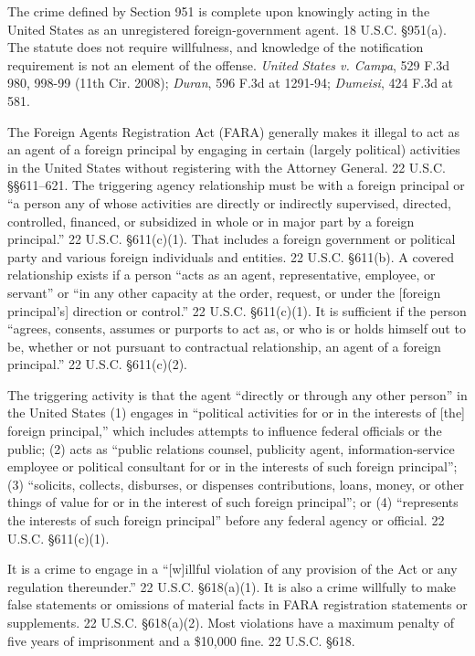 The crime defined by Section 951 is complete upon knowingly acting in the United States as an unregistered foreign-government agent.
18 U.S.C. \S 951(a).
The statute does not require willfulness, and knowledge of the notification requirement is not an element of the offense.
\textit{United States v. Campa}, 529 F.3d 980, 998-99 (11th Cir. 2008); \textit{Duran}, 596 F.3d at 1291-94; \textit{Dumeisi}, 424 F.3d at 581.

The Foreign Agents Registration Act (FARA) generally makes it illegal to act as an agent of a foreign principal by engaging in certain (largely political) activities in the United States without registering with the Attorney General. 22 U.S.C. \S\S 611--621. The triggering agency relationship must be with a foreign principal or ``a person any of whose activities are directly or indirectly supervised, directed, controlled, financed, or subsidized in whole or in major part by a foreign principal.'' 22 U.S.C. \S 611(c)(1).
That includes a foreign government or political party and various foreign individuals and entities.
22 U.S.C. \S 611(b).
A covered relationship exists if a person ``acts as an agent, representative, employee, or servant'' or ``in any other capacity at the order, request, or under the [foreign principal's] direction or control.''
22 U.S.C. \S 611(c)(1).
It is sufficient if the person ``agrees, consents, assumes or purports to act as, or who is or holds himself out to be, whether or not pursuant to contractual relationship, an agent of a foreign principal.''
22 U.S.C. \S 611(c)(2).

The triggering activity is that the agent ``directly or through any other person'' in the United States (1) engages in ``political activities for or in the interests of [the] foreign principal,'' which includes attempts to influence federal officials or the public; (2) acts as ``public relations counsel, publicity agent, information-service employee or political consultant for or in the interests of such foreign principal''; (3) ``solicits, collects, disburses, or dispenses contributions, loans, money, or other things of value for or in the interest of such foreign principal''; or (4) ``represents the interests of such foreign principal'' before any federal agency or official.
22 U.S.C. \S 611(c)(1).

It is a crime to engage in a ``[w]illful violation of any provision of the Act or any regulation thereunder.''
22 U.S.C. \S 618(a)(1).
It is also a crime willfully to make false statements or omissions of material facts in FARA registration statements or supplements.
22 U.S.C. \S 618(a)(2).
Most violations have a maximum penalty of five years of imprisonment and a \$10,000 fine.
22 U.S.C. \S 618.

